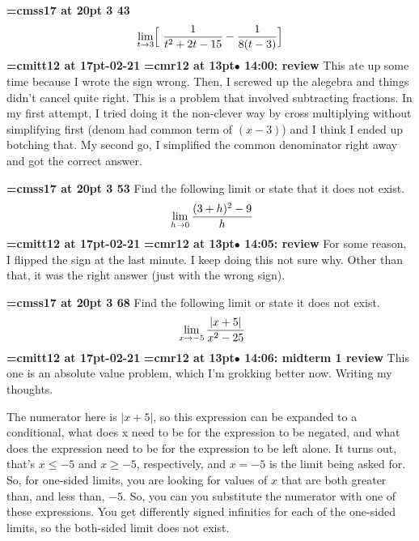 {\medskip\noindent\bf\font\titlefont=cmss17 at 20pt 3 43}\medskip
$$\lim_{t \to 3} \Bigl[ {\
{1
\over
t^2 + 2t - 15}
-
{1 \over 8(t - 3)}
}\Bigr]
$$
{\medskip\noindent\bf\font\titlefont=cmitt12 at 17pt-02-21}\medskip
{\smallskip\noindent\bf\font\titlefont=cmr12 at 13pt\titlefont $\bullet$ 14:00: review}\smallskip
This ate up some time because I wrote the sign wrong. Then, I screwed up the alegebra and things didn't cancel quite right. This is a problem that involved subtracting fractions. In my first attempt, I tried doing it the non-clever way by cross multiplying without simplifying first (denom had common term of $(x - 3)$) and I think I ended up botching that. My second go, I simplified the common denominator right away and got the correct answer.
\par

{\medskip\noindent\bf\font\titlefont=cmss17 at 20pt 3 53}\medskip
Find the following limit or state that it does not exist.
$$\
\lim_{h \to 0}{
(3 + h)^2 - 9
\over
h
}
$$
{\medskip\noindent\bf\font\titlefont=cmitt12 at 17pt-02-21}\medskip
{\smallskip\noindent\bf\font\titlefont=cmr12 at 13pt\titlefont $\bullet$ 14:05: review}\smallskip
For some reason, I flipped the sign at the last minute. I keep doing this not sure why. Other than that, it was the right answer (just with the wrong sign).
\par

{\medskip\noindent\bf\font\titlefont=cmss17 at 20pt 3 68}\medskip
Find the following limit or state it does not exist.
$$\
\lim_{x \to -5} {
| x + 5 |
\over
x^2 - 25
}
$$
{\medskip\noindent\bf\font\titlefont=cmitt12 at 17pt-02-21}\medskip
{\smallskip\noindent\bf\font\titlefont=cmr12 at 13pt\titlefont $\bullet$ 14:06: midterm 1 review}\smallskip
This one is an absolute value problem, which I'm grokking better now. Writing my thoughts.
\par

The numerator here is $|x + 5|$, so this expression can be expanded to a conditional, what does x need to be for the expression to be negated, and what does the expression need to be for the expression to be left alone. It turns out, that's $x \le -5$ and $x \ge -5$, respectively, and $x = -5$ is the limit being asked for. So, for one-sided limits, you are looking for values of $x$ that are both greater than, and less than, $-5$. So, you can you substitute the numerator with one of these expressions. You get differently signed infinities for each of the one-sided limits, so the both-sided limit does not exist.
\par

